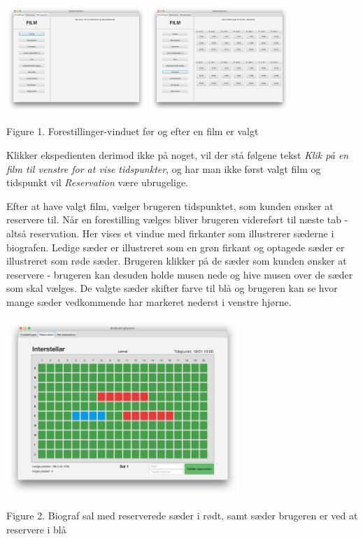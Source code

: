 \documentclass[final]{rapport1}
\begin{document}
\begin{picture}

\includegraphics[width=150pt]{1.png}
\includegraphics[width=150pt]{2.png}

\end{picture}
\begin{center}
\tiny Figure 1. Forestillinger-vinduet før og efter en film er valgt
\end{center}

Klikker ekspedienten derimod ikke på noget, vil der stå følgene tekst \emph{Klik på en film til venstre for at vise tidspunkter}, og har man ikke først valgt film og tidspunkt vil \emph{Reservation} være ubrugelige.

Efter at have valgt film, vælger brugeren tidspunktet, som kunden ønsker at reservere til. Når en forestilling vælges bliver brugeren videreført til næste tab - altså reservation. Her vises et vindue med firkanter som illustrerer sæderne i biografen. Ledige sæder er illustreret som en grøn firkant og optagede sæder er illustreret som røde sæder. Brugeren klikker på de sæder som kunden ønsker at reservere - brugeren kan desuden holde musen nede og hive musen over de sæder som skal vælges. De valgte sæder skifter farve til blå og brugeren kan se hvor mange sæder vedkommende har markeret nederst i venstre hjørne. 

\begin{picture}

\includegraphics[width=250pt]{3.png}

\end{picture}
\begin{center}
\tiny Figure 2. Biograf sal med reserverede sæder i rødt, samt sæder brugeren er ved at reservere i blå
\end{center}
\end{document}
